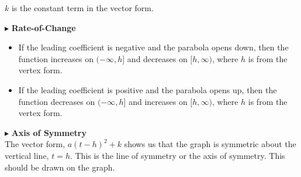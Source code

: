 \documentclass{ximera}
\begin{document}
$k$ is the constant term in the vector form.




$\blacktriangleright$ \textbf{\textcolor{red!10!blue!90!}{Rate-of-Change}} \\
\begin{itemize}
\item If the leading coefficient is negative and the parabola opens down, then the function increases on $(-\infty, h]$ and decreases on $[h, \infty)$, where $h$ is from the vertex form.
\item If the leading coefficient is positive and the parabola opens up, then the function decreases on $(-\infty, h]$ and increases on $[h, \infty)$, where $h$ is from the vertex form.
\end{itemize}





$\blacktriangleright$ \textbf{\textcolor{red!10!blue!90!}{Axis of Symmetry}} \\ 
The vector form, $a(t-h)^2 + k$ shows us that the graph is symmetric about the vertical line, $t=h$.  This is the line of symmetry or the axis of symmetry.  This should be drawn on the graph.
\end{document}
